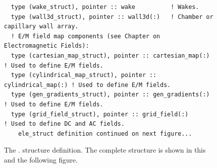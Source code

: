 \begin{figure}[htb]
\begin{verbatim}
  type (wake_struct), pointer :: wake          ! Wakes.
  type (wall3d_struct), pointer :: wall3d(:)   ! Chamber or capillary wall array.
  ! E/M field map components (see Chapter on Electromagnetic Fields):
  type (cartesian_map_struct), pointer :: cartesian_map(:)     ! Used to define E/M fields.
  type (cylindrical_map_struct), pointer :: cylindrical_map(:) ! Used to define E/M fields.
  type (gen_gradients_struct), pointer :: gen_gradients(:)       ! Used to define E/M fields.
  type (grid_field_struct), pointer :: grid_field(:)           ! Used to define DC and AC fields.
    ele_struct definition continued on next figure...
\end{verbatim}
\caption[The  (part 1).]{The . structure definition. 
The complete structure is shown in this and the following figure.}
\label{f:ele.struct1}
\end{figure}


